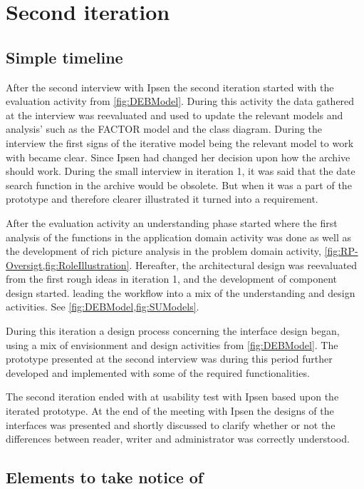 \section{Second iteration}
\subsection{Simple timeline}
After the second interview with Ipsen the second iteration started with the evaluation activity from \cref{fig:DEBModel}. 
During this activity the data gathered at the interview was reevaluated and used to update the relevant models and analysis' such as the FACTOR model and the class diagram.
During the interview the first signs of the iterative model being the relevant model to work with became clear.
Since Ipsen had changed her decision upon how the archive should work.
 During the small interview in iteration 1, it was said that the date search function in the archive would be obsolete.
But when it was a part of the prototype and therefore clearer illustrated it turned into a requirement.

After the evaluation activity an understanding phase started where the first analysis of the functions in the application domain activity was done as well as the development of rich picture analysis in the problem domain activity, \cref{fig:RP-Oversigt,fig:RoleIllustration}.
Hereafter, the architectural design was reevaluated from the first rough ideas in iteration 1, and the development of component design started.
leading the workflow into a mix of the understanding and design activities. 
See \cref{fig:DEBModel,fig:SUModels}.

During this iteration a design process concerning the interface design began, using a mix of envisionment and design activities from \cref{fig:DEBModel}.
The prototype presented at the second interview was during this period further developed and implemented with some of the required functionalities.

The second iteration ended with at usability test with Ipsen based upon the iterated prototype. 
At the end of the meeting with Ipsen the designs of the interfaces was presented and shortly discussed to clarify whether or not the differences between reader, writer and administrator was correctly understood.

\subsection{Elements to take notice of}
